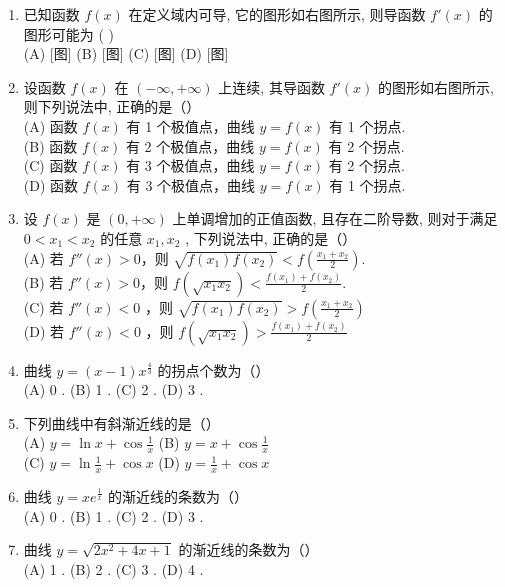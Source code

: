 \documentclass[12pt, a4paper]{ctexart}
\begin{document}
\begin{enumerate}
    \item 已知函数 $ f(x) $ 在定义域内可导, 它的图形如右图所示, 则导函数 $ f'(x) $ 的图形可能为 ( )\\
    (A) [图] (B) [图] (C) [图] (D) [图]

    \item 设函数 $ f(x) $ 在 $ (-\infty, +\infty) $ 上连续, 其导函数 $ f'(x) $ 的图形如右图所示, 则下列说法中, 正确的是（）\\
    (A) 函数 $ f(x) $ 有 1 个极值点，曲线 $ y = f(x) $ 有 1 个拐点.\\
    (B) 函数 $ f(x) $ 有 2 个极值点，曲线 $ y = f(x) $ 有 2 个拐点.\\
    (C) 函数 $ f(x) $ 有 3 个极值点，曲线 $ y = f(x) $ 有 2 个拐点.\\
    (D) 函数 $ f(x) $ 有 3 个极值点，曲线 $ y = f(x) $ 有 1 个拐点.

    \item 设 $ f(x) $ 是 $ (0,+\infty) $ 上单调增加的正值函数, 且存在二阶导数, 则对于满足 $ 0<x_{1}<x_{2} $ 的任意 $ x_{1}, x_{2} $ , 下列说法中, 正确的是（）\\
    (A) 若 $ f''(x) > 0 $，则 $ \sqrt{f(x_{1})f(x_{2})} < f\left(\frac{x_{1} + x_{2}}{2}\right) $.\\
    (B) 若 $ f''(x) > 0 $，则 $ f\left(\sqrt{x_1 x_2}\right) < \frac{f\left(x_1\right) + f\left(x_2\right)}{2} $.\\
    (C) 若 $ f''(x)<0 $ ，则 $ \sqrt{f(x_{1})f(x_{2})}>f\left(\frac{x_{1}+x_{2}}{2}\right) $\\
    (D) 若 $ f''(x)<0 $ ，则 $ f\left(\sqrt{x_{1}x_{2}}\right)>\frac{f\left(x_{1}\right)+f\left(x_{2}\right)}{2} $

    \item 曲线 $ y=(x-1)x^{\frac{4}{3}} $ 的拐点个数为（）\\
    (A) 0 . \quad (B) 1 . \quad (C) 2 . \quad (D) 3 .

    \item 下列曲线中有斜渐近线的是（）\\
    (A) $ y = \ln x + \cos \frac{1}{x} $ \quad (B) $ y = x + \cos \frac{1}{x} $\\
    (C) $ y = \ln \frac{1}{x} + \cos x $ \quad (D) $ y = \frac{1}{x} + \cos x $

    \item 曲线 $ y = xe^{\frac{1}{x}} $ 的渐近线的条数为（）\\
    (A) 0 . \quad (B) 1 . \quad (C) 2 . \quad (D) 3 .

    \item 曲线 $ y=\sqrt{2x^{2}+4x+1} $ 的渐近线的条数为（）\\
    (A) 1 . \quad (B) 2 . \quad (C) 3 . \quad (D) 4 .


\end{enumerate}
\end{document}
